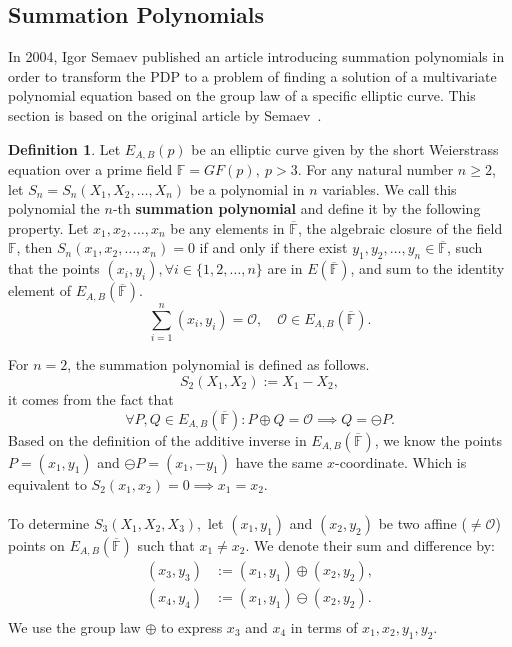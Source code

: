 \documentclass[thesis=M,english]{FITthesis}[2012/10/20]
\theoremstyle{remark}
\theoremstyle{definition}
\newtheorem{DF}{Definition}[section]
\begin{document}
\subsection{Summation Polynomials}\label{sumpoly}
\noindent In 2004, Igor Semaev published an article introducing summation polynomials in order to transform the PDP to a problem of finding a solution of a multivariate polynomial equation based on the group law of a specific elliptic curve. This section is based on the original article by Semaev~\cite{semaev04}.
\begin{DF}
Let $E_{A,B}(p)$ be an elliptic curve given by the short Weierstrass equation over a prime field $\mathbb{F} = GF(p),\ p > 3$. For any natural number $n \geq 2$, let $S_n = S_n(X_1, X_2, \ldots, X_n)$ be a polynomial in $n$ variables. We call this polynomial the $n$-th \textbf{summation polynomial} and define it by the following property. Let $x_1,x_2,\ldots,x_n$ be any elements in $\overline{\mathbb{F}}$, the algebraic closure of the field $\mathbb{F}$, then $S_n(x_1,x_2,\ldots,x_n)=0$ if and only if there exist $y_1,y_2,\ldots,y_n \in \overline{\mathbb{F}}$, such that the points $(x_i,y_i), \forall i \in \{1,2,\ldots,n\}$ are in $E(\overline{\mathbb{F}})$, and sum to the identity element of $E_{A,B}(\overline{\mathbb{F}})$.
$$
\sum_{i=1}^n (x_i,y_i) = \mathcal{O}, \quad  \mathcal{O} \in E_{A,B}(\overline{\mathbb{F}}).
$$
\end{DF}
\noindent For $n=2$, the summation polynomial is defined as follows. 
$$
S_2(X_1, X_2) := X_1 - X_2,
$$ it comes from the fact that 
$$
\forall P, Q \in E_{A,B}(\overline{\mathbb{F}}): P \oplus Q = \mathcal{O} \implies  Q = \ominus P.
$$
Based on the definition of the additive inverse in $E_{A,B}(\overline{\mathbb{F}})$, we know the points $P = (x_1,y_1)$ and $\ominus P = (x_1, -y_1)$ have the same $x$-coordinate. Which is equivalent to $S_2(x_1, x_2) = 0 \implies x_1 = x_2.$ 
\\\\
\noindent To determine $S_3(X_1,X_2,X_3),$ let $(x_1,y_1)$ and $(x_2, y_2)$ be two affine ($\neq  \mathcal{O}$) points on $E_{A,B}(\overline{\mathbb{F}})$ such that $x_1 \neq x_2.$ We denote their sum and difference by:
\begin{align*}
(x_3,y_3) &:= (x_1,y_1) \oplus (x_2,y_2),\\
(x_4,y_4) &:= (x_1,y_1) \ominus (x_2,y_2).\\
\end{align*}
We use the group law $\oplus$ to express $x_3$ and $x_4$ in terms of $x_1,x_2, y_1, y_2$.
\end{document}
